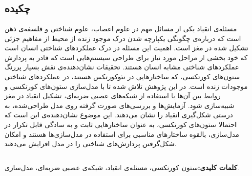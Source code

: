 \documentclass[12pt]{report}
\begin{document}
	\pagestyle{empty}
	\pagenumbering{}
	
	\newpage
	\pagestyle{plain}
	\setcounter{page}{1}
	
	
	\chapter*{}
	\section*{چکیده}
	مسئله‌ی انقیاد یکی از مسائل مهم در علوم اعصاب، علوم شناختی و فلسفه‌ی ذهن است که درباره‌ی چگونگی یکپارچه شدن درک موجود زنده از محیط از مفاهیم جزئی تشکیل شده در مغز است. اهمیت این مسئله در درک عملکرد‌‌های شناختی انسان است که خود بخشی از مراحل مورد نیاز برای طراحی سیستم‌هایی است که قادر به پردازش عملکرد‌های شناختی مشابه انسان هستند. تحقیقات نشان‌دهنده‌ی نقش بسیار پررنگ ستون‌های کورتکسی، که ساختار‌هایی در نئوکورتکس هستند، در عملکرد‌های شناختی موجودات زنده است. در این پژوهش تلاش شده تا با مدل‌سازی ستون‌های کورتکسی و روابط بین آن‌ها با استفاده از شبکه‌های عصبی ضربه‌ای، تشکیل انقیاد در مغز شبیه‌سازی شود.  آزمایش‌ها و بررسی‌های صورت گرفته روی مدل طراحی‌شده، به درستی شکل‌گیری انقیاد را نشان می‌دهند. این موضوع نشان‌دهنده‌ی این است که احتمالا ستون‌های کورتکسی، به عنوان ساختار‌هایی ثابت و به سادگی قابل تکرار در مدل‌سازی، بالقوه ساختار‌های مناسبی برای استفاده در مدل‌سازی‌ها هستند و امکان شکل‌‌گرفتن پردازش‌های شناختی را در مدل افزایش می‌دهند. 
	
	\section*{}
	\textbf{کلمات کلیدی:}\quad ستون کورتکسی، مسئله‌ی انقیاد، شبکه‌ی عصبی ضربه‌ای، مدل‌سازی.
	
	
	
	
\end{document}
